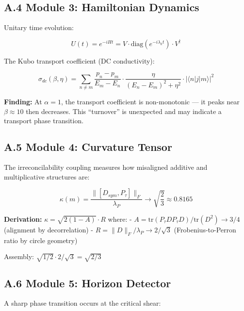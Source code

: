 \documentclass[
  11pt,
]{article}
\numberwithin{equation}{section}
\begin{document}
\subsection{A.4 Module 3: Hamiltonian
Dynamics}\label{a.4-module-3-hamiltonian-dynamics}

Unitary time evolution:

\begin{equation}U(t) = e^{-iHt} = V \cdot \text{diag}(e^{-i\lambda_k t}) \cdot V^\dagger\end{equation}

The Kubo transport coefficient (DC conductivity):

\begin{equation}\sigma_{dc}(\beta, \eta) = \sum_{n \neq m} \frac{p_n - p_m}{E_m - E_n} \cdot \frac{\eta}{(E_n - E_m)^2 + \eta^2} \cdot |\langle n|j|m \rangle|^2\end{equation}

\textbf{Finding:} At \(\alpha = 1\), the transport coefficient is
non-monotonic --- it peaks near \(\beta \approx 10\) then decreases.
This ``turnover'' is unexpected and may indicate a transport phase
transition.

\subsection{A.5 Module 4: Curvature
Tensor}\label{a.5-module-4-curvature-tensor}

The irreconcilability coupling measures how misaligned additive and
multiplicative structures are:

\begin{equation}\kappa(m) = \frac{\|[D_{sym}, P_\tau]\|_F}{\lambda_P} \to \sqrt{\frac{2}{3}} \approx 0.8165\end{equation}

\textbf{Derivation:} \(\kappa = \sqrt{2(1-A)} \cdot R\) where: -
\(A = \text{tr}(P_\tau D P_\tau D) / \text{tr}(D^2) \to 3/4\) (alignment
by decorrelation) - \(R = \|D\|_F / \lambda_P \to 2/\sqrt{3}\)
(Frobenius-to-Perron ratio by circle geometry)

Assembly: \(\sqrt{1/2} \cdot 2/\sqrt{3} = \sqrt{2/3}\)

\subsection{A.6 Module 5: Horizon
Detector}\label{a.6-module-5-horizon-detector}

A sharp phase transition occurs at the critical shear:
\end{document}
